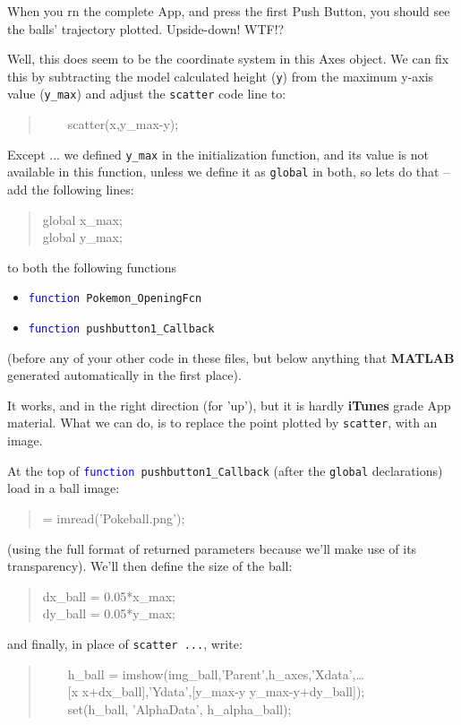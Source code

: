 \documentclass{tufte-book} %
\newenvironment{docspec}{\begin{quotation}\ttfamily\parskip0pt\parindent0pt\ignorespaces}{\end{quotation}}
\begin{document}
When you rn the complete App, and press the first \textsf{Push Button}, you should see the balls' trajectory plotted. Upside-down! WTF!?

Well, this does seem to be the coordinate system in this \textsf{Axes} object. We can fix this by subtracting the model calculated height (\texttt{y}) from the maximum y-axis value (\texttt{y\_max}) and adjust the \texttt{scatter} code line to:
\begin{docspec}
\ \ \ \    scatter(x,y\_max-y);
\end{docspec}
Except ... we defined \texttt{y\_max} in the initialization function, and its value is not available in this function, unless we define it as \texttt{global} in both, so lets do that -- add the following lines:
\begin{docspec}
global x\_max;
\\global y\_max;
\end{docspec}
to both the following functions
\begin{itemize}[noitemsep]
\setlength{\itemindent}{.2in}
\item \texttt{\textcolor{blue}{function} Pokemon\_OpeningFcn}
\item \texttt{\textcolor{blue}{function} pushbutton1\_Callback }
\end{itemize}
(before any of your other code in these files, but below anything that \textbf{MATLAB} generated automatically in the first place).

It works, and in the right direction (for 'up'), but it is hardly \textbf{iTunes} grade App material. What we can do, is to replace the point plotted by \texttt{scatter}, with an image.

At the top of \texttt{\textcolor{blue}{function} pushbutton1\_Callback} (after the \texttt{global} declarations) load in a ball image:
\begin{docspec}
[img\_ball, h\_map\_ball, h\_alpha\_ball] = imread('Pokeball.png');
\end{docspec}
(using the full format of returned parameters because we'll make use of its transparency). We'll then define the size of the ball:
\begin{docspec}
dx\_ball = 0.05*x\_max;
\\dy\_ball = 0.05*y\_max;
\end{docspec}
and finally, in place of \texttt{scatter ...}, write:
\begin{docspec}
\ \ \ \ h\_ball = imshow(img\_ball,'Parent',h\_axes,'Xdata',\ldots
\\ \ \ \ \ [x x+dx\_ball],'Ydata',[y\_max-y y\_max-y+dy\_ball]);
\\ \ \ \ \ set(h\_ball, 'AlphaData', h\_alpha\_ball);
\end{docspec}
\end{document}
